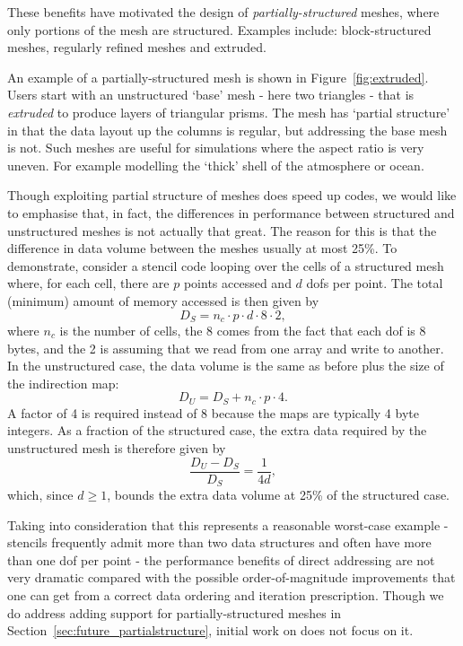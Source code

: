 These benefits have motivated the design of \textit{partially-structured} meshes, where only portions of the mesh are structured.
Examples include: block-structured meshes, regularly refined meshes and extruded.

An example of a partially-structured mesh is shown in Figure~\ref{fig:extruded}.
Users start with an unstructured `base' mesh - here two triangles - that is \textit{extruded} to produce layers of triangular prisms.
The mesh has `partial structure' in that the data layout up the columns is regular, but addressing the base mesh is not.
Such meshes are useful for simulations where the aspect ratio is very uneven.
For example modelling the `thick' shell of the atmosphere or ocean.

Though exploiting partial structure of meshes does speed up codes, we would like to emphasise that, in fact, the differences in performance between structured and unstructured meshes is not actually that great.
The reason for this is that the difference in data volume between the meshes usually at most 25\%.
To demonstrate, consider a stencil code looping over the cells of a structured mesh where, for each cell, there are $p$ points accessed and $d$ \glspl{dof} per point.
The total (minimum) amount of memory accessed is then given by
\begin{equation*}
  D_S = n_c \cdot p \cdot d \cdot 8 \cdot 2,
\end{equation*}
where $n_c$ is the number of cells, the 8 comes from the fact that each \gls{dof} is 8 bytes, and the 2 is assuming that we read from one array and write to another.
In the unstructured case, the data volume is the same as before plus the size of the indirection map:
\begin{equation*}
  D_U = D_S + n_c \cdot p \cdot 4.
\end{equation*}
A factor of 4 is required instead of 8 because the maps are typically 4 byte integers.
As a fraction of the structured case, the extra data required by the unstructured mesh is therefore given by
\begin{equation*}
  \frac{D_U - D_S}{D_S} = \frac{1}{4d},
\end{equation*}
which, since $d \geq 1$, bounds the extra data volume at 25\% of the structured case.

Taking into consideration that this represents a reasonable worst-case example - stencils frequently admit more than two data structures and often have more than one \gls{dof} per point - the performance benefits of direct addressing are not very dramatic compared with the possible order-of-magnitude improvements that one can get from a correct data ordering and iteration prescription.
Though we do address adding support for partially-structured meshes in Section~\ref{sec:future_partialstructure}, initial work on  does not focus on it.

